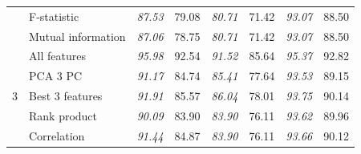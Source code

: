 \documentclass{llncs}
\begin{document}
\begin{table}
\begin{tabular}{|r|l|p{1.2cm}|p{1.2cm}|p{1.2cm}|p{1.2cm}|p{1.2cm}|p{1.2cm}|}
                                                     & F-statistic                                           & \textit{87.53}                      & 79.08                              & \textit{80.71}                      & 71.42                              & \textit{93.07}                      & 88.50                              \\
                                                     & Mutual information                                    & \textit{87.06}                      & 78.75                              & \textit{80.71}                      & 71.42                              & \textit{93.07}                      & 88.50                              \\ \hline
\multirow{7}{*}{3}                                   & All features                                          & \textit{95.98}                      & 92.54                              & \textit{91.52}                      & 85.64                              & \textit{95.37}                      & 92.82                              \\
                                                     & PCA 3 PC                                              & \textit{91.17}                      & 84.74                              & \textit{85.41}                      & 77.64                              & \textit{93.53}                      & 89.15                              \\
                                                     & Best 3 features                                       & \textit{91.91}                      & 85.57                              & \textit{86.04}                      & 78.01                              & \textit{93.75}                      & 90.14                              \\
                                                     & Rank product                                          & \textit{90.09}                      & 83.90                              & \textit{83.90}                      & 76.11                              & \textit{93.62}                      & 89.96                              \\
                                                     & Correlation                                           & \textit{91.44}                      & 84.87                              & \textit{83.90}                      & 76.11                              & \textit{93.66}                      & 90.12                              \\

\end{tabular}
\end{table}
\end{document}
